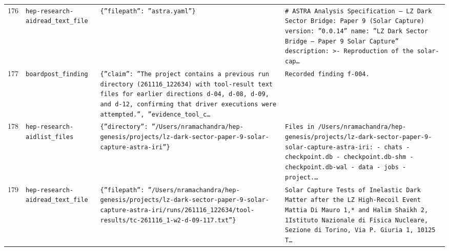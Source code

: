 \documentclass[11pt,a4paper]{article}
\begin{document}
\begin{longtable}{@{}p{}p{}p{}p{}@{}}
176 & \texttt{hep-research-aid}\newline\texttt{read\_\allowbreak{}text\_\allowbreak{}file} & \texttt{\{''filepath'':\allowbreak{} ''astra.yaml''\}\allowbreak{}} & \texttt{\# ASTRA Analysis Specification --- LZ Dark Sector Bridge:\allowbreak{} Paper 9 (Solar Capture)\allowbreak{}  version:\allowbreak{} ''0.0.14'' name:\allowbreak{} ''LZ Dark Sector Bridge --- Paper 9 Solar Capture'' description:\allowbreak{} \textgreater{}\allowbreak{}-   Reproduction of the solar-cap\ldots{}\allowbreak{}} \\
177 & \texttt{board}\newline\texttt{post\_\allowbreak{}finding} & \texttt{\{''claim'':\allowbreak{} ''The project contains a previous run directory (261116\_\allowbreak{}122634)\allowbreak{} with tool-result text files for earlier directions d-04,\allowbreak{} d-08,\allowbreak{} d-09,\allowbreak{} and d-12,\allowbreak{} confirming that driver executions were attempted.'',\allowbreak{} ''evidence\_\allowbreak{}tool\_\allowbreak{}c\ldots{}\allowbreak{}} & \texttt{Recorded finding f-004.} \\
178 & \texttt{hep-research-aid}\newline\texttt{list\_\allowbreak{}files} & \texttt{\{''directory'':\allowbreak{} ''/\allowbreak{}Users/\allowbreak{}nramachandra/\allowbreak{}hep-genesis/\allowbreak{}projects/\allowbreak{}lz-dark-sector-paper-9-solar-capture-astra-iri''\}\allowbreak{}} & \texttt{Files in /\allowbreak{}Users/\allowbreak{}nramachandra/\allowbreak{}hep-genesis/\allowbreak{}projects/\allowbreak{}lz-dark-sector-paper-9-solar-capture-astra-iri:\allowbreak{}   - chats   - checkpoint.db   - checkpoint.db-shm   - checkpoint.db-wal   - data   - jobs   - project.\ldots{}\allowbreak{}} \\
179 & \texttt{hep-research-aid}\newline\texttt{read\_\allowbreak{}text\_\allowbreak{}file} & \texttt{\{''filepath'':\allowbreak{} ''/\allowbreak{}Users/\allowbreak{}nramachandra/\allowbreak{}hep-genesis/\allowbreak{}projects/\allowbreak{}lz-dark-sector-paper-9-solar-capture-astra-iri/\allowbreak{}runs/\allowbreak{}261116\_\allowbreak{}122634/\allowbreak{}tool-results/\allowbreak{}tc-261116\_\allowbreak{}1-w2-d-09-117.txt''\}\allowbreak{}} & \texttt{Solar Capture Tests of Inelastic Dark Matter after the LZ High-Recoil Event Mattia Di Mauro 1,\allowbreak{}* and Halim Shaikh 2,\allowbreak{}\dag{}\allowbreak{} 1Istituto Nazionale di Fisica Nucleare,\allowbreak{} Sezione di Torino,\allowbreak{} Via P. Giuria 1,\allowbreak{} 10125 T\ldots{}\allowbreak{}} \\

\end{longtable}
\end{document}
